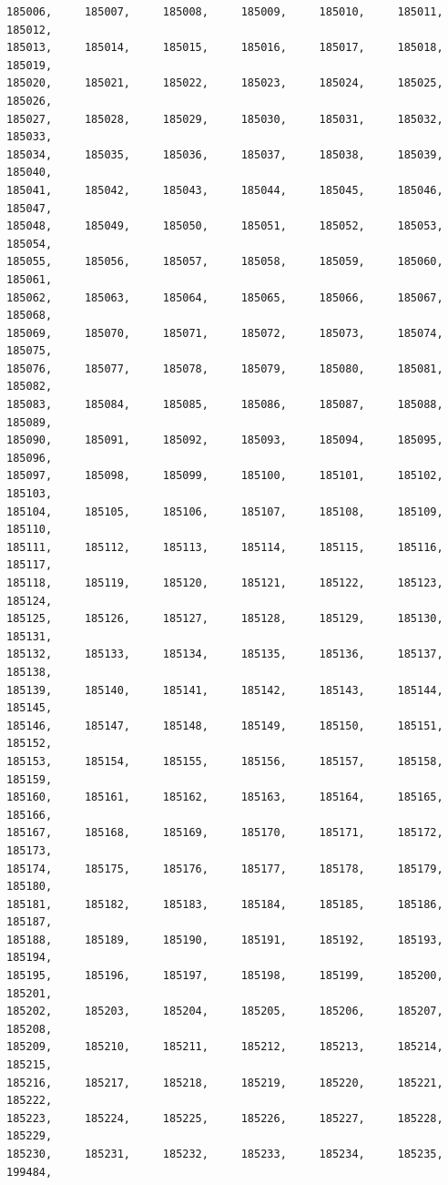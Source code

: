 \documentclass[a4paper,11pt]{report}
\begin{document}
\begin{verbatim}
185006,     185007,     185008,     185009,     185010,     185011,     185012,
185013,     185014,     185015,     185016,     185017,     185018,     185019,
185020,     185021,     185022,     185023,     185024,     185025,     185026,
185027,     185028,     185029,     185030,     185031,     185032,     185033,
185034,     185035,     185036,     185037,     185038,     185039,     185040,
185041,     185042,     185043,     185044,     185045,     185046,     185047,
185048,     185049,     185050,     185051,     185052,     185053,     185054,
185055,     185056,     185057,     185058,     185059,     185060,     185061,
185062,     185063,     185064,     185065,     185066,     185067,     185068,
185069,     185070,     185071,     185072,     185073,     185074,     185075,
185076,     185077,     185078,     185079,     185080,     185081,     185082,
185083,     185084,     185085,     185086,     185087,     185088,     185089,
185090,     185091,     185092,     185093,     185094,     185095,     185096,
185097,     185098,     185099,     185100,     185101,     185102,     185103,
185104,     185105,     185106,     185107,     185108,     185109,     185110,
185111,     185112,     185113,     185114,     185115,     185116,     185117,
185118,     185119,     185120,     185121,     185122,     185123,     185124,
185125,     185126,     185127,     185128,     185129,     185130,     185131,
185132,     185133,     185134,     185135,     185136,     185137,     185138,
185139,     185140,     185141,     185142,     185143,     185144,     185145,
185146,     185147,     185148,     185149,     185150,     185151,     185152,
185153,     185154,     185155,     185156,     185157,     185158,     185159,
185160,     185161,     185162,     185163,     185164,     185165,     185166,
185167,     185168,     185169,     185170,     185171,     185172,     185173,
185174,     185175,     185176,     185177,     185178,     185179,     185180,
185181,     185182,     185183,     185184,     185185,     185186,     185187,
185188,     185189,     185190,     185191,     185192,     185193,     185194,
185195,     185196,     185197,     185198,     185199,     185200,     185201,
185202,     185203,     185204,     185205,     185206,     185207,     185208,
185209,     185210,     185211,     185212,     185213,     185214,     185215,
185216,     185217,     185218,     185219,     185220,     185221,     185222,
185223,     185224,     185225,     185226,     185227,     185228,     185229,
185230,     185231,     185232,     185233,     185234,     185235,     199484,

\end{verbatim}
\end{document}
